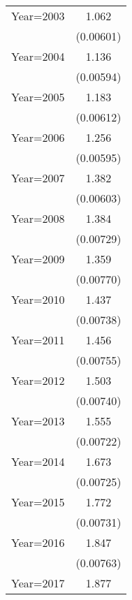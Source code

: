 {\begin{longtable}{l*{1}{c}}
\addlinespace
Year=2003           &       1.062\sym{***}\\
                    &   (0.00601)         \\
\addlinespace
Year=2004           &       1.136\sym{***}\\
                    &   (0.00594)         \\
\addlinespace
Year=2005           &       1.183\sym{***}\\
                    &   (0.00612)         \\
\addlinespace
Year=2006           &       1.256\sym{***}\\
                    &   (0.00595)         \\
\addlinespace
Year=2007           &       1.382\sym{***}\\
                    &   (0.00603)         \\
\addlinespace
Year=2008           &       1.384\sym{***}\\
                    &   (0.00729)         \\
\addlinespace
Year=2009           &       1.359\sym{***}\\
                    &   (0.00770)         \\
\addlinespace
Year=2010           &       1.437\sym{***}\\
                    &   (0.00738)         \\
\addlinespace
Year=2011           &       1.456\sym{***}\\
                    &   (0.00755)         \\
\addlinespace
Year=2012           &       1.503\sym{***}\\
                    &   (0.00740)         \\
\addlinespace
Year=2013           &       1.555\sym{***}\\
                    &   (0.00722)         \\
\addlinespace
Year=2014           &       1.673\sym{***}\\
                    &   (0.00725)         \\
\addlinespace
Year=2015           &       1.772\sym{***}\\
                    &   (0.00731)         \\
\addlinespace
Year=2016           &       1.847\sym{***}\\
                    &   (0.00763)         \\
\addlinespace
Year=2017           &       1.877\sym{***}\\

\end{longtable}}

